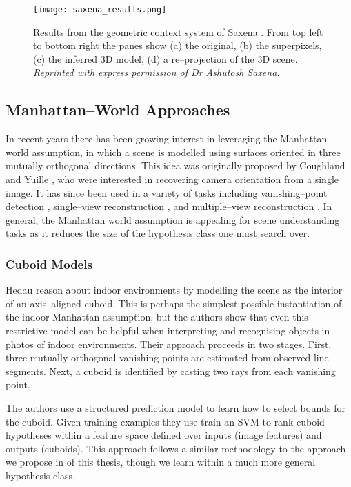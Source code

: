 \begin{figure}[tb]
\centering
\texttt{[image: saxena\_results.png]}
\caption{Results from the geometric context system of Saxena \etal
  \cite{Saxena09}. From top left to bottom right the panes show (a)
  the original, (b) the superpixels, (c) the inferred 3D model, (d) a
  re--projection of the 3D scene.
  \textit{Reprinted with express permission of Dr Ashutosh Saxena.}
  }
\label{fig:saxena-result}
\end{figure}

\subsection{Manhattan--World Approaches}

In recent years there has been growing interest in leveraging the
Manhattan world assumption, in which a scene is modelled using
surfaces oriented in three mutually orthogonal directions. This idea
was originally proposed by Coughland and Yuille \cite{Coughlan99}, who
were interested in recovering camera orientation from a single
image. It has since been used in a variety of tasks including
vanishing--point detection \cite{Zhang02}, single--view reconstruction
\cite{Lee09,Flint10eccv}, and multiple--view reconstruction
\cite{Furukawa09,Flint11}. In general, the Manhattan world assumption
is appealing for scene understanding tasks as it reduces the size of
the hypothesis class one must search over.

\subsubsection{Cuboid Models}

Hedau \etal \cite{Hedau2009} reason about indoor environments by
modelling the scene as the interior of an axis--aligned cuboid. This
is perhaps the simplest possible instantiation of the indoor Manhattan
assumption, but the authors show that even this restrictive model can
be helpful when interpreting and recognising objects in photos of
indoor environments. Their approach proceeds in two stages. First,
three mutually orthogonal vanishing points are estimated from
observed line segments. Next, a cuboid is identified by casting two
rays from each vanishing point.

The authors use a structured prediction model to learn how to select
bounds for the cuboid. Given training examples they use train an SVM
to rank cuboid hypotheses within a feature space defined over inputs
(image features) and outputs (cuboids). This approach follows a
similar methodology to the approach we propose in 
of this thesis, though we learn within a much more general hypothesis
class.

